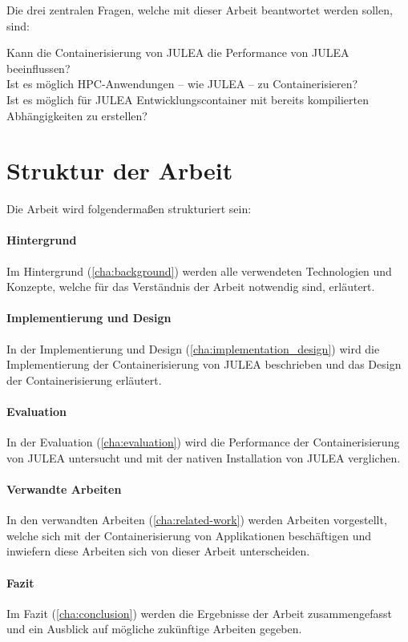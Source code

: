 Die drei zentralen Fragen, welche mit dieser Arbeit beantwortet werden sollen, sind:

Kann die Containerisierung von JULEA die Performance von JULEA beeinflussen? \\
Ist es möglich HPC-Anwendungen – wie JULEA – zu Containerisieren? \\
Ist es möglich für JULEA Entwicklungscontainer mit bereits kompilierten Abhängigkeiten zu erstellen?

\section{Struktur der Arbeit}

Die Arbeit wird folgendermaßen strukturiert sein:

\paragraph{Hintergrund}

Im Hintergrund (\cref{cha:background}) werden alle verwendeten Technologien und Konzepte, welche für das Verständnis der Arbeit notwendig sind, erläutert.

\paragraph{Implementierung und Design}

In der Implementierung und Design (\cref{cha:implementation_design}) wird die Implementierung der Containerisierung von JULEA beschrieben und das Design der Containerisierung erläutert.

\paragraph{Evaluation}

In der Evaluation (\cref{cha:evaluation}) wird die Performance der Containerisierung von JULEA untersucht und mit der nativen Installation von JULEA verglichen.

\paragraph{Verwandte Arbeiten}

In den verwandten Arbeiten (\cref{cha:related-work}) werden Arbeiten vorgestellt, welche sich mit der Containerisierung von Applikationen beschäftigen und inwiefern diese Arbeiten sich von dieser Arbeit unterscheiden.

\paragraph{Fazit}

Im Fazit (\cref{cha:conclusion}) werden die Ergebnisse der Arbeit zusammengefasst und ein Ausblick auf mögliche zukünftige Arbeiten gegeben.

